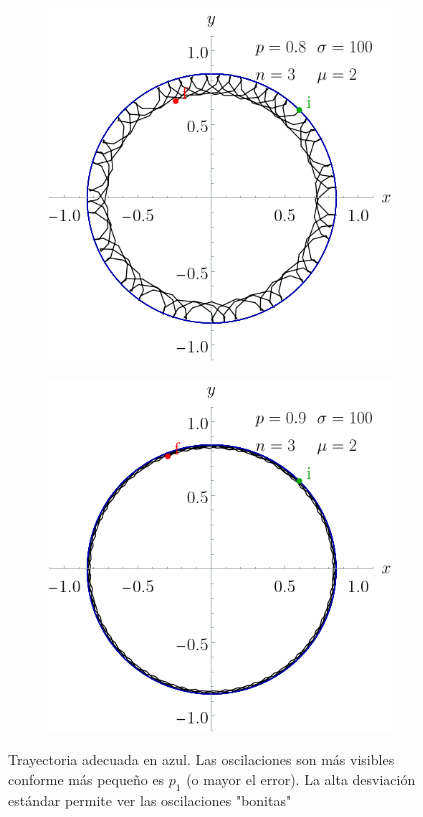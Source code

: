 \begin{figure}[ht!]
    \centering
    \begin{subfigure}{0.5\textwidth}
      \centering
      \includegraphics[width=0.9\linewidth]{chapter3/figures_separable/sphere_traject_ALL_sigmaz_normal_freq_mean=2_std=100_n=3_p=0.8_both.png}
    \end{subfigure}%
    \begin{subfigure}{0.5\textwidth}
      \centering
      \includegraphics[width=0.9\linewidth]{chapter3/figures_separable/sphere_traject_ALL_sigmaz_normal_freq_mean=2_std=100_n=3_p=0.9_both.png}
    \end{subfigure}
    \caption{Trayectoria adecuada en azul. Las oscilaciones son más visibles conforme más pequeño es $p_{1}$ (o mayor el error). La alta desviación estándar permite ver las oscilaciones "bonitas"}\label{fig:Oscilations13}
\end{figure}

